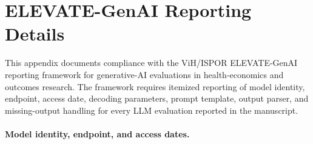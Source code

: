 \documentclass[11pt]{article}
\begin{document}
\section{ELEVATE-GenAI Reporting Details}
\label{app:elevate_genai}

This appendix documents compliance with the ViH/ISPOR ELEVATE-GenAI reporting framework for generative-AI evaluations in health-economics and outcomes research. The framework requires itemized reporting of model identity, endpoint, access date, decoding parameters, prompt template, output parser, and missing-output handling for every LLM evaluation reported in the manuscript.

\paragraph{Model identity, endpoint, and access dates.}
\end{document}
